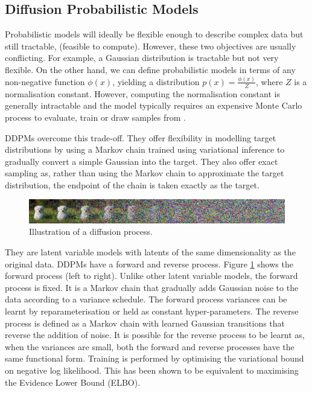\documentclass{article}
\begin{document}
\subsection{Diffusion Probabilistic Models}

Probabilistic models will ideally be flexible enough to describe complex data but still tractable, (feasible to compute). However, these two objectives are usually conflicting. For example, a Gaussian distribution is tractable but not very flexible. On the other hand, we can define probabilistic models in terms of any non-negative function $\phi(x)$, yielding a distribution $p(x)=\frac{\phi(x)}{Z}$, where $Z$ is a normalisation constant. However, computing the normalisation constant is generally intractable and the model typically requires an expensive Monte Carlo process to evaluate, train or draw samples from  \cite{Sohl-Dickstein-2015}.

DDPMs overcome this trade-off. They offer flexibility in modelling target distributions by using a Markov chain trained using variational inference to gradually convert a simple Gaussian into the target. They also offer exact sampling as, rather than using the Markov chain to approximate the target distribution, the endpoint of the chain is taken exactly as the target.

\begin{figure}[h]
\centering
\includegraphics[width=1\textwidth]{Diffusion.png}
\caption{\label{fig:Diffusion}Illustration of a diffusion process. \cite{Sohl-Dickstein-2015}}
\end{figure}

They are latent variable models with latents of the same dimensionality as the original data. DDPMs have a forward and reverse process. Figure \ref{fig:Diffusion} shows the forward process (left to right). Unlike other latent variable models, the forward process is fixed. It is a Markov chain that gradually adds Gaussian noise to the data according to a variance schedule. The forward process variances can be learnt by reparameterisation or held as constant hyper-parameters. The reverse process is defined as a Markov chain with learned Gaussian transitions that reverse the addition of noise. It is possible for the reverse process to be learnt as, when the variances are small, both the forward and reverse processes have the same functional form. Training is performed by optimising the variational bound on negative log likelihood. This has been shown to be equivalent to maximising the Evidence Lower Bound (ELBO).
\end{document}
